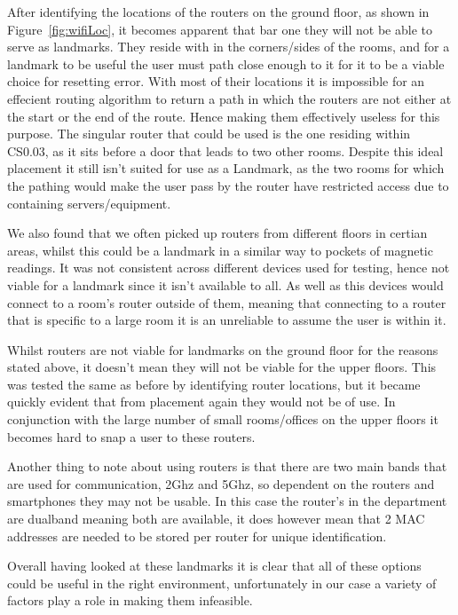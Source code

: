 \documentclass[12pt,a4paper]{report}
\begin{document}
After identifying the locations of the routers on the ground floor, as shown in Figure~\ref{fig:wifiLoc}, it becomes apparent that bar one they will not be able to serve as landmarks. They reside with in the corners/sides of the rooms, and for a landmark to be useful the user must path close enough to it for it to be a viable choice for resetting error. With most of their locations it is impossible for an effecient routing algorithm to return a path in which the routers are not either at the start or the end of the route. Hence making them effectively useless for this purpose. The singular router that could be used is the one residing within CS0.03, as it sits before a door that leads to two other rooms. Despite this ideal placement it still isn't suited for use as a Landmark, as the two rooms for which the pathing would make the user pass by the router have restricted access due to containing servers/equipment.

We also found that we often picked up routers from different floors in certian areas, whilst this could be a landmark in a similar way to pockets of magnetic readings. It was not consistent across different devices used for testing, hence not viable for a landmark since it isn't available to all. As well as this devices would connect to a room's router outside of them, meaning that connecting to a router that is specific to a large room it is an unreliable to assume the user is within it.

Whilst routers are not viable for landmarks on the ground floor for the reasons stated above, it doesn't mean they will not be viable for the upper floors. This was tested the same as before by identifying router locations, but it became quickly evident that from placement again they would not be of use. In conjunction with the large number of small rooms/offices on the upper floors it becomes hard to snap a user to these routers.

Another thing to note about using routers is that there are two main bands that are used for communication, 2Ghz and 5Ghz, so dependent on the routers and smartphones they may not be usable. In this case the router's in the department are dualband meaning both are available, it does however mean that 2 MAC addresses are needed to be stored per router for unique identification.

Overall having looked at these landmarks it is clear that all of these options could be useful in the right environment, unfortunately in our case a variety of factors play a role in making them infeasible.
\end{document}
